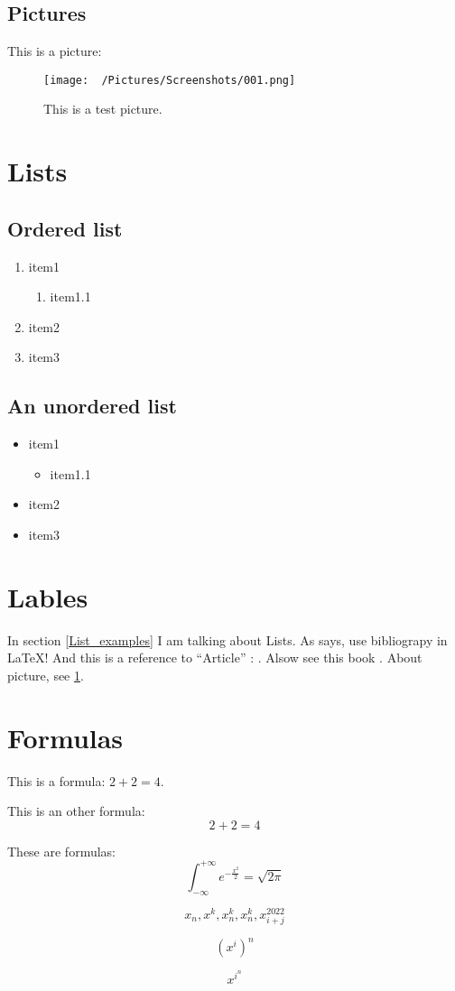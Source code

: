
\subsection{Pictures}
This is a picture:
\begin{figure}[!hbtp]
    \begin{center}
    \texttt{[image: ~/Pictures/Screenshots/001.png]}
    \end{center}
    \caption{This is a test picture.\label{Picture_example}}
\end{figure}


\section{Lists\label{List_examples}}

\subsection{Ordered list}
\begin{enumerate}
    \item item1
        \begin{enumerate}
            \item item1.1
        \end{enumerate}
    \item item2
    \item item3
\end{enumerate}

\subsection{An unordered list}
\begin{itemize}
    \item item1
        \begin{itemize}
            \item item1.1
        \end{itemize}
    \item item2
    \item item3
\end{itemize}

\section{Lables}
In section \ref{List_examples} I am talking about Lists. As
\textcite{example1} says, use bibliograpy in \LaTeX{}! And this is a reference
to ``Article'' : \textcite{example2}. Alsow see this book
\parencite{example3}. About picture, see \ref{Picture_example}.

\section{Formulas}
This is a formula: $2 + 2 = 4$.

This is an other formula:
\[2 + 2 = 4\]

These are formulas:
\[\int_{-\infty}^{+\infty} e^{-\frac{x^2}{2}} = \sqrt{2 \pi}\]

\[x_n, x^k, x_n^k, x^k_n, x_{i + j}^{2022}\]

\[(x^i)^n\]

\[x^{i^n}\]

\listoffigures
\printbibliography


